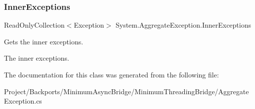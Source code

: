 \subsubsection{\texorpdfstring{Inner\+Exceptions}{InnerExceptions}}
{\footnotesize\ttfamily Read\+Only\+Collection$<$Exception$>$ System.\+Aggregate\+Exception.\+Inner\+Exceptions\hspace{0.3cm}{\ttfamily [get]}}



Gets the inner exceptions. 

The inner exceptions.

The documentation for this class was generated from the following file\+:\begin{DoxyCompactItemize}
\item 
Project/\+Backports/\+Minimum\+Async\+Bridge/\+Minimum\+Threading\+Bridge/Aggregate\+Exception.\+cs\end{DoxyCompactItemize}
